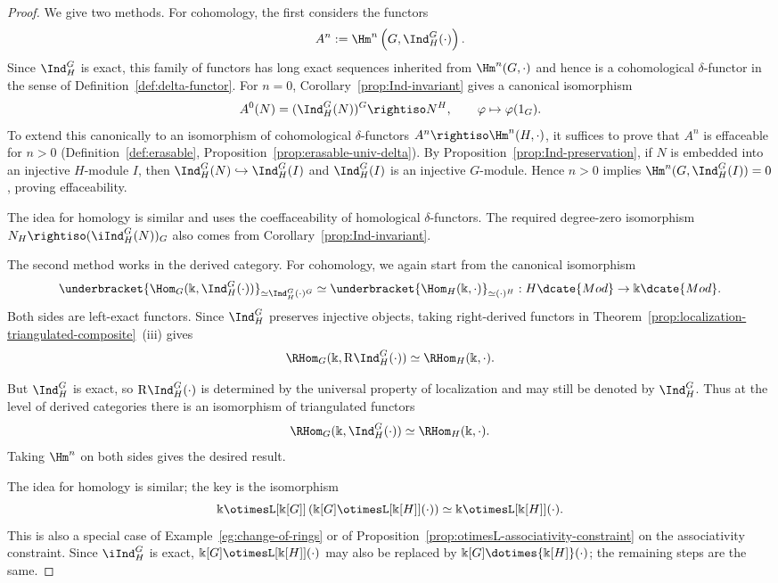 \begin{proof}
	We give two methods. For cohomology, the first considers the functors
	\[ A^n:=\Hm^n\left(G,\Ind^G_H(\cdot)\right). \]
	Since $\Ind^G_H$ is exact, this family of functors has long exact
	sequences inherited from $\Hm^n(G,\cdot)$ and hence is a cohomological
	$\delta$-functor in the sense of Definition~\ref{def:delta-functor}.
	For $n=0$, Corollary~\ref{prop:Ind-invariant} gives a canonical
	isomorphism
	\[ A^0(N)=(\Ind^G_H(N))^G\rightiso N^H,\qquad
	\varphi\mapsto\varphi(1_G). \]
	To extend this canonically to an isomorphism of cohomological
	$\delta$-functors $A^n\rightiso\Hm^n(H,\cdot)$, it suffices to prove
	that $A^n$ is effaceable for $n>0$
	(Definition~\ref{def:erasable}, Proposition~\ref{prop:erasable-univ-delta}).
	By Proposition~\ref{prop:Ind-preservation}, if $N$ is embedded into an
	injective $H$-module $I$, then
	$\Ind^G_H(N)\hookrightarrow\Ind^G_H(I)$ and $\Ind^G_H(I)$ is an
	injective $G$-module. Hence $n>0$ implies
	$\Hm^n(G,\Ind^G_H(I))=0$, proving effaceability.

	The idea for homology is similar and uses the coeffaceability of
	homological $\delta$-functors. The required degree-zero isomorphism
	$N_H\rightiso(\iInd^G_H(N))_G$ also comes from
	Corollary~\ref{prop:Ind-invariant}.

	The second method works in the derived category. For cohomology, we again
	start from the canonical isomorphism
	\[ \underbracket{\Hom_G(\Bbbk,\Ind^G_H(\cdot))}_{
	\simeq\Ind^G_H(\cdot)^G}
	\simeq
	\underbracket{\Hom_H(\Bbbk,\cdot)}_{\simeq(\cdot)^H}
	:H\dcate{Mod}\to\Bbbk\dcate{Mod}. \]
	Both sides are left-exact functors. Since $\Ind^G_H$ preserves injective
	objects, taking right-derived functors in
	Theorem~\ref{prop:localization-triangulated-composite}~(iii) gives
	\begin{equation*}
		\RHom_G(\Bbbk,\mathrm{R}\Ind^G_H(\cdot))
		\simeq\RHom_H(\Bbbk,\cdot).
	\end{equation*}

	But $\Ind^G_H$ is exact, so $\mathrm{R}\Ind^G_H(\cdot)$ is determined by
	the universal property of localization and may still be denoted by
	$\Ind^G_H$. Thus at the level of derived categories there is an
	isomorphism of triangulated functors
	\[ \RHom_G(\Bbbk,\Ind^G_H(\cdot))
	\simeq\RHom_H(\Bbbk,\cdot). \]
	Taking $\Hm^n$ on both sides gives the desired result.

	The idea for homology is similar; the key is the isomorphism
	\[ \Bbbk\otimesL[{\Bbbk[G]}]
	\left(\Bbbk[G]\otimesL[{\Bbbk[H]}](\cdot)\right)
	\simeq\Bbbk\otimesL[{\Bbbk[H]}](\cdot). \]
	This is also a special case of Example~\ref{eg:change-of-rings} or of
	Proposition~\ref{prop:otimesL-associativity-constraint} on the
	associativity constraint. Since $\iInd^G_H$ is exact,
	$\Bbbk[G]\otimesL[{\Bbbk[H]}](\cdot)$ may also be replaced by
	$\Bbbk[G]\dotimes{\Bbbk[H]}(\cdot)$; the remaining steps are the same.
\end{proof}

